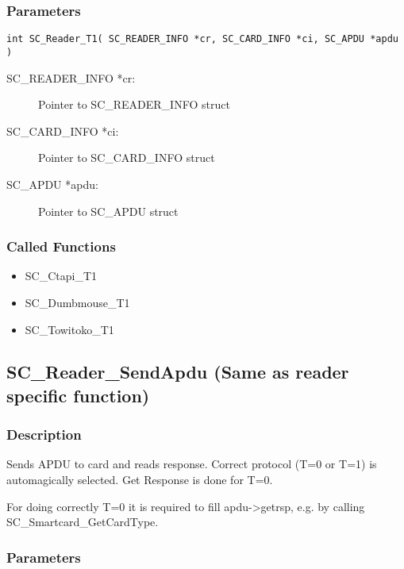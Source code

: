 \documentclass[a4paper,oneside]{article}
\begin{document}
\subsubsection*{Parameters}

\begin{verbatim}
int SC_Reader_T1( SC_READER_INFO *cr, SC_CARD_INFO *ci, SC_APDU *apdu )
\end{verbatim}

\begin{description}
\item[SC\_READER\_INFO *cr:] Pointer to SC\_READER\_INFO struct
\item[SC\_CARD\_INFO *ci:] Pointer to SC\_CARD\_INFO struct
\item[SC\_APDU *apdu:] Pointer to SC\_APDU struct
\end{description}

\subsubsection*{Called Functions}

\begin{itemize}
\item SC\_Ctapi\_T1
\item SC\_Dumbmouse\_T1
\item SC\_Towitoko\_T1
\end{itemize}


\subsection{SC\_Reader\_SendApdu (Same as reader specific function)}

\subsubsection*{Description}

Sends APDU to card and reads response. Correct protocol (T=0 or T=1)
is automagically selected. Get Response is done for T=0.

For doing correctly T=0 it is required to fill apdu->getrsp,
e.g. by calling SC\_Smartcard\_GetCardType.

\subsubsection*{Parameters}
\end{document}

